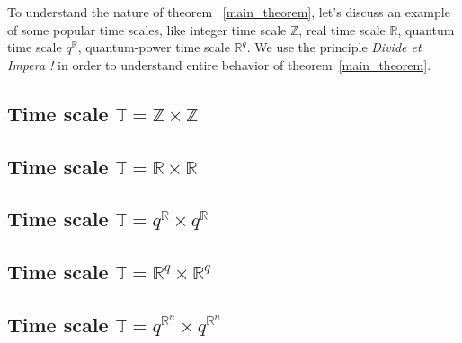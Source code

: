 To understand the nature of theorem ~\ref{main_theorem}, let's discuss an example of some popular time scales,
like integer time scale $\mathbb{Z}$, real time scale $\mathbb{R}$, quantum time scale $q^{\mathbb{R}}$,
quantum-power time scale $\mathbb{R}^q$.
We use the principle \textit{Divide et Impera !} in order to understand entire behavior of theorem~\ref{main_theorem}.

\subsection{Time scale $\mathbb{T} = \mathbb{Z} \times \mathbb{Z}$} \label{subsec:time_scale_z}


\subsection{Time scale $\mathbb{T} = \mathbb{R} \times \mathbb{R}$} \label{subsec:time_scale_r}


\subsection{Time scale $\mathbb{T} = q^\mathbb{R} \times q^\mathbb{R}$} \label{subsec:time_scale_qn}


\subsection{Time scale $\mathbb{T} = \mathbb{R}^q \times \mathbb{R}^q$} \label{subsec:time_scale_nq}


\subsection{Time scale $\mathbb{T} = q^{\mathbb{R}^n} \times q^{\mathbb{R}^n}$} \label{subsec:pure_quantum_power}
